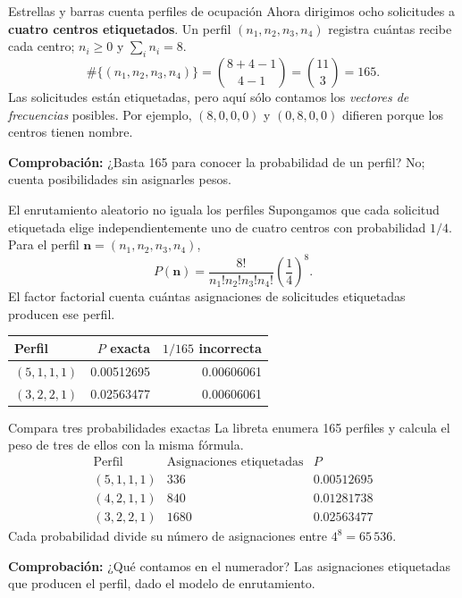 \documentclass[aspectratio=169,10pt,spanish]{beamer}
\begin{document}
\begin{frame}{Estrellas y barras cuenta perfiles de ocupación}
\small
Ahora dirigimos ocho solicitudes a \textbf{cuatro centros etiquetados}. Un perfil $(n_1,n_2,n_3,n_4)$ registra cuántas recibe cada centro; $n_i\geq0$ y $\sum_i n_i=8$.
\[
\#\{(n_1,n_2,n_3,n_4)\}=\binom{8+4-1}{4-1}=\binom{11}{3}=165.
\]
Las solicitudes están etiquetadas, pero aquí sólo contamos los \emph{vectores de frecuencias} posibles. Por ejemplo, $(8,0,0,0)$ y $(0,8,0,0)$ difieren porque los centros tienen nombre.
\par\medskip
\textbf{Comprobación:} ¿Basta 165 para conocer la probabilidad de un perfil? No; cuenta posibilidades sin asignarles pesos.
\end{frame}

\begin{frame}{El enrutamiento aleatorio no iguala los perfiles}
\small
Supongamos que cada solicitud etiquetada elige independientemente uno de cuatro centros con probabilidad $1/4$. Para el perfil $\boldsymbol n=(n_1,n_2,n_3,n_4)$,
\[
P(\boldsymbol n)=\frac{8!}{n_1!n_2!n_3!n_4!}\left(\frac14\right)^8.
\]
El factor factorial cuenta cuántas asignaciones de solicitudes etiquetadas producen ese perfil.
\begin{center}
\begin{tabular}{lrr}
\toprule Perfil & $P$ exacta & $1/165$ incorrecta \\ \midrule
$(5,1,1,1)$ & 0.00512695 & 0.00606061\\
$(3,2,2,1)$ & 0.02563477 & 0.00606061\\ \bottomrule
\end{tabular}
\end{center}
\end{frame}

\begin{frame}{Compara tres probabilidades exactas}
\small
La libreta enumera 165 perfiles y calcula el peso de tres de ellos con la misma fórmula.
\[
\begin{array}{c|c|c}
\text{Perfil}&\text{Asignaciones etiquetadas}&P\\\hline
(5,1,1,1)&336&0.00512695\\
(4,2,1,1)&840&0.01281738\\
(3,2,2,1)&1680&0.02563477
\end{array}
\]
Cada probabilidad divide su número de asignaciones entre $4^8=65\,536$.
\par\medskip
\textbf{Comprobación:} ¿Qué contamos en el numerador? Las asignaciones etiquetadas que producen el perfil, dado el modelo de enrutamiento.
\end{frame}
\end{document}
